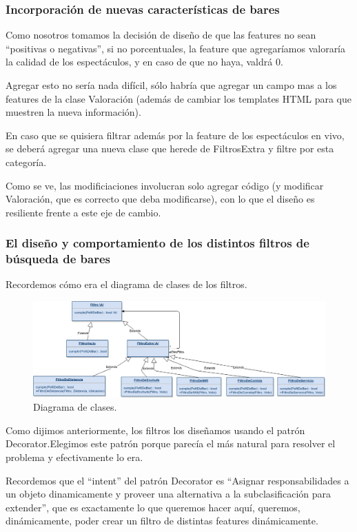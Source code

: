 \subsubsection{Incorporación de nuevas características de bares}

Como nosotros tomamos la decisión de diseño de que las features no sean ``positivas o negativas'', si no porcentuales, la feature que agregaríamos valoraría la calidad de los espectáculos, y en caso de que no haya, valdrá 0.

Agregar esto no sería nada difícil, sólo habría que agregar un campo mas a los features de la clase Valoración (además de cambiar los templates HTML para que muestren la nueva información).

En caso que se quisiera filtrar además por la feature de los espectáculos en vivo, se deberá agregar una nueva clase que herede de FiltrosExtra y filtre por esta categoría.

Como se ve, las modificiaciones involucran solo agregar código (y modificar Valoración, que es correcto que deba modificarse), con lo que el diseño es resiliente frente a este eje de cambio.

\subsubsection{El diseño y comportamiento de los distintos filtros de búsqueda de bares}

Recordemos cómo era el diagrama de clases de los filtros.

\begin{figure}[H]
  \centering
  \includegraphics[width=\textwidth]{diagramas/filtro_clases.png}
  \caption{\normalfont Diagrama de clases.}
\end{figure}


Como dijimos anteriormente, los filtros los diseñamos usando el patrón Decorator.Elegimos este patrón porque parecía el más natural para resolver el problema y efectivamente lo era.

Recordemos que el ``intent'' del patrón Decorator es ``Asignar responsabilidades a un objeto dinamicamente y proveer una alternativa a la subclasificación para extender'', que es exactamente lo que queremos hacer aquí, queremos, dinámicamente, poder crear un filtro de distintas features dinámicamente.

